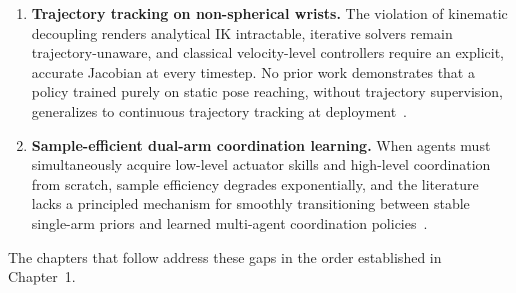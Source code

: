 \begin{enumerate}
    \item \textbf{Trajectory tracking on non-spherical wrists.} The violation of kinematic decoupling
    renders analytical IK intractable, iterative solvers remain trajectory-unaware, and classical
    velocity-level controllers require an explicit, accurate Jacobian at every timestep. No prior
    work demonstrates that a policy trained purely on static pose reaching, without trajectory
    supervision, generalizes to continuous trajectory tracking at
    deployment~\citep{sk2025diktracking}.

    \item \textbf{Sample-efficient dual-arm coordination learning.} When agents must simultaneously
    acquire low-level actuator skills and high-level coordination from scratch, sample efficiency
    degrades exponentially, and the literature lacks a principled mechanism for smoothly
    transitioning between stable single-arm priors and learned multi-agent coordination
    policies~\citep{sk2026priorguided}.
\end{enumerate}

The chapters that follow address these gaps in the order established in Chapter~1.
